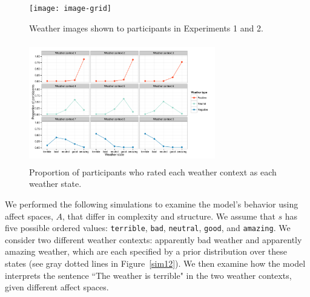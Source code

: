 \documentclass[10pt,letterpaper]{article}
\begin{document}
\begin{figure}
    \begin{minipage}{0.45\textwidth}
        \texttt{[image: image-grid]}
        \caption{Weather images shown to participants in Experiments 1 and 2.}
        \label{images}
    \end{minipage}
    \hfill
    \hfill
    \begin{minipage}{0.45\textwidth}
        \includegraphics[width=230pt, height=150pt]{priors}
        \caption{Proportion of participants who rated each weather context as each weather state. 
     }
        \label{priors}
    \end{minipage}
\end{figure}

We performed the following simulations to examine the model's behavior using affect spaces, $A$, that differ in complexity and structure.  
We assume that $s$ has five possible ordered values: \texttt{terrible}, \texttt{bad}, \texttt{neutral}, \texttt{good}, and \texttt{amazing}. We consider two different weather contexts: apparently bad weather and apparently amazing weather, which are each specified by a prior distribution over these states (see gray dotted lines in Figure~\ref{sim12}). We then examine how the model interprets the sentence ``The weather is terrible" in the two weather contexts, given different affect spaces.
\end{document}
